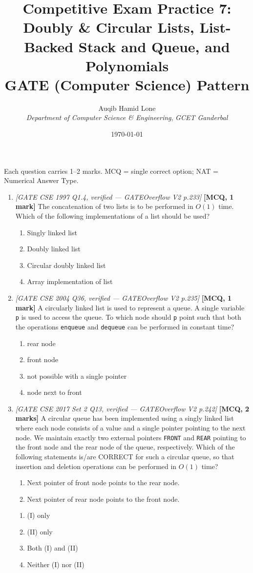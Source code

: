 \documentclass[11pt]{article}
\title{Competitive Exam Practice 7: Doubly \& Circular Lists, List-Backed Stack and Queue, and Polynomials\\\large GATE (Computer Science) Pattern}
\author{Auqib Hamid Lone\\[0.3em]
  \emph{Department of Computer Science \& Engineering}, \emph{GCET Ganderbal}}
\date{\today}
\begin{document}
\maketitle

\noindent Each question carries 1--2 marks. MCQ = single correct option; NAT = Numerical Answer Type.

\begin{enumerate}
\item[\textbf{Q1}] \textit{[GATE CSE 1997 Q1.4, verified --- GATEOverflow V2 p.233]} \textbf{[MCQ, 1 mark]} The concatenation of two lists is to be performed in $O(1)$ time. Which of the following implementations of a list should be used?
\begin{enumerate}
  \item[(A)] Singly linked list
  \item[(B)] Doubly linked list
  \item[(C)] Circular doubly linked list
  \item[(D)] Array implementation of list
\end{enumerate}

\item[\textbf{Q2}] \textit{[GATE CSE 2004 Q36, verified --- GATEOverflow V2 p.235]} \textbf{[MCQ, 1 mark]} A circularly linked list is used to represent a queue. A single variable \texttt{p} is used to access the queue. To which node should \texttt{p} point such that both the operations \texttt{enqueue} and \texttt{dequeue} can be performed in constant time?
\begin{enumerate}
  \item[(A)] rear node
  \item[(B)] front node
  \item[(C)] not possible with a single pointer
  \item[(D)] node next to front
\end{enumerate}

\item[\textbf{Q3}] \textit{[GATE CSE 2017 Set 2 Q13, verified --- GATEOverflow V2 p.242]} \textbf{[MCQ, 2 marks]} A circular queue has been implemented using a singly linked list where each node consists of a value and a single pointer pointing to the next node. We maintain exactly two external pointers \texttt{FRONT} and \texttt{REAR} pointing to the front node and the rear node of the queue, respectively. Which of the following statements is/are CORRECT for such a circular queue, so that insertion and deletion operations can be performed in $O(1)$ time?
\begin{enumerate}
  \item[I.] Next pointer of front node points to the rear node.
  \item[II.] Next pointer of rear node points to the front node.
\end{enumerate}
\begin{enumerate}
  \item[(A)] (I) only
  \item[(B)] (II) only
  \item[(C)] Both (I) and (II)
  \item[(D)] Neither (I) nor (II)
\end{enumerate}


\end{enumerate}
\end{document}
